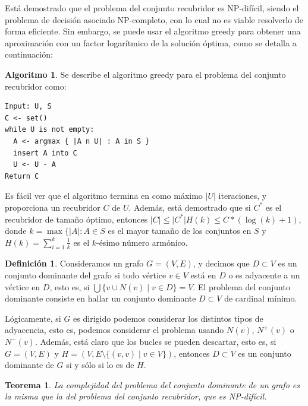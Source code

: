 \documentclass[a4paper,12pt]{report}
\newtheorem{thm}{Teorema}
\theoremstyle{definition}
\newtheorem{dfn}{Definición}
\newtheorem{alg}{Algoritmo}
\begin{document}
Está demostrado que el problema del conjunto recubridor es NP-difícil, siendo el problema de decisión asociado NP-completo\cite{korte2012combinatorial}, con lo cual no es viable resolverlo de forma eficiente. Sin embargo, se puede usar el algoritmo greedy\cite{cormen2001introduction} para obtener una aproximación con un factor logarítmico de la solución óptima, como se detalla a continuación:

\begin{alg}
  \label{alg:setcover}
  Se describe el algoritmo greedy para el problema del conjunto recubridor como:
\begin{verbatim}
Input: U, S
C <- set()
while U is not empty:
  A <- argmax { |A n U| : A in S }
  insert A into C
  U <- U - A
Return C
\end{verbatim}
\end{alg}

Es fácil ver que el algoritmo termina en como máximo $\lvert U \rvert$ iteraciones, y
proporciona un recubridor $C$ de $U$. Además, está demostrado\cite{chvatal1979greedy} que si $C^*$ es el recubridor de tamaño óptimo, entonces $\lvert C \rvert \leq \lvert C^* \rvert H(k) \leq C*(\log(k) +1)$, donde $k = \max \lbrace \lvert A \rvert : A \in S$ es el mayor tamaño de los conjuntos en $S$ y $H(k) = \sum_{i=1}^k \frac{1}{k}$ es el $k$-ésimo número armónico.

\begin{dfn}
  Consideramos un grafo $G = (V,E)$, y decimos que $D \subset V$ es un conjunto dominante del grafo si todo vértice $v \in V$ está en $D$ o es adyacente a un vértice en $D$, esto es, si $ \bigcup \lbrace v \cup N(v) \mid v \in D \rbrace = V $. El problema del conjunto dominante consiste en hallar un conjunto dominante $D \subset V$ de cardinal mínimo.
\end{dfn}

Lógicamente, si $G$ es dirigido podemos considerar los distintos tipos de adyacencia, esto es, podemos considerar el problema usando $N(v)$, $N^+(v)$ o $N^-(v)$. Además, está claro que los bucles se pueden descartar, esto es, si $G = (V,E)$ y $H = (V, E \setminus \lbrace (v,v) \mid v \in V \rbrace)$, entonces $D \subset V$ es un conjunto dominante de $G$ si y sólo si lo es de $H$.


\begin{thm}
  La complejidad del problema del conjunto dominante de un grafo es la misma que la del problema del conjunto recubridor, que es NP-difícil.
\end{thm}
\end{document}
